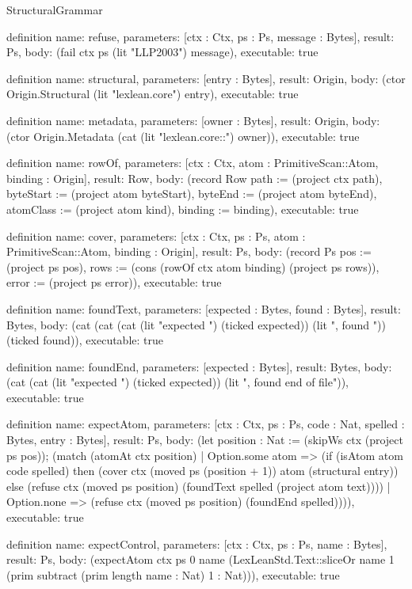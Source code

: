 \begin{lexlean}{StructuralGrammar}
\begin{semanticmodule}
definition{
  name: refuse,
  parameters: [ctx : Ctx, ps : Ps, message : Bytes],
  result: Ps,
  body: (fail ctx ps (lit "LLP2003") message),
  executable: true
}

definition{
  name: structural,
  parameters: [entry : Bytes],
  result: Origin,
  body: (ctor Origin.Structural (lit "lexlean.core") entry),
  executable: true
}

definition{
  name: metadata,
  parameters: [owner : Bytes],
  result: Origin,
  body: (ctor Origin.Metadata (cat (lit "lexlean.core::") owner)),
  executable: true
}

definition{
  name: rowOf,
  parameters: [ctx : Ctx, atom : PrimitiveScan::Atom, binding : Origin],
  result: Row,
  body: (record Row {path := (project ctx path), byteStart := (project atom byteStart), byteEnd := (project atom byteEnd), atomClass := (project atom kind), binding := binding}),
  executable: true
}

definition{
  name: cover,
  parameters: [ctx : Ctx, ps : Ps, atom : PrimitiveScan::Atom, binding : Origin],
  result: Ps,
  body: (record Ps {pos := (project ps pos), rows := (cons (rowOf ctx atom binding) (project ps rows)), error := (project ps error)}),
  executable: true
}

definition{
  name: foundText,
  parameters: [expected : Bytes, found : Bytes],
  result: Bytes,
  body: (cat (cat (cat (lit "expected ") (ticked expected)) (lit ", found ")) (ticked found)),
  executable: true
}

definition{
  name: foundEnd,
  parameters: [expected : Bytes],
  result: Bytes,
  body: (cat (cat (lit "expected ") (ticked expected)) (lit ", found end of file")),
  executable: true
}

definition{
  name: expectAtom,
  parameters: [ctx : Ctx, ps : Ps, code : Nat, spelled : Bytes, entry : Bytes],
  result: Ps,
  body: (let position : Nat := (skipWs ctx (project ps pos)); (match (atomAt ctx position)
    | Option.some atom => (if (isAtom atom code spelled) then (cover ctx (moved ps (position + 1)) atom (structural entry)) else (refuse ctx (moved ps position) (foundText spelled (project atom text))))
    | Option.none => (refuse ctx (moved ps position) (foundEnd spelled)))),
  executable: true
}

definition{
  name: expectControl,
  parameters: [ctx : Ctx, ps : Ps, name : Bytes],
  result: Ps,
  body: (expectAtom ctx ps 0 name (LexLeanStd.Text::sliceOr name 1 (prim subtract (prim length name : Nat) 1 : Nat))),
  executable: true
}


\end{semanticmodule}
\end{lexlean}
